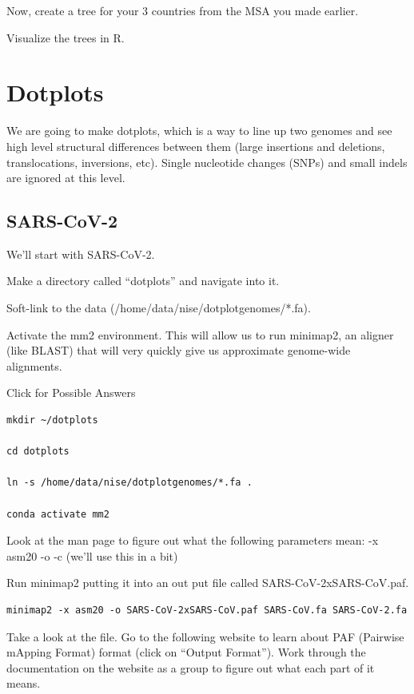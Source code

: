 \documentclass[
]{book}
\begin{document}
\hfill\break

Now, create a tree for your 3 countries from the MSA you made earlier.

Visualize the trees in R.

\hypertarget{dotplots}{%
\chapter{Dotplots}\label{dotplots}}

We are going to make dotplots, which is a way to line up two genomes and see high level structural differences between them (large insertions and deletions, translocations, inversions, etc). Single nucleotide changes (SNPs) and small indels are ignored at this level.

\hypertarget{sars-cov-2}{%
\section{SARS-CoV-2}\label{sars-cov-2}}

We'll start with SARS-CoV-2.

Make a directory called ``dotplots'' and navigate into it.

Soft-link to the data (/home/data/nise/dotplotgenomes/*.fa).

Activate the mm2 environment. This will allow us to run minimap2, an aligner (like BLAST) that will very quickly give us approximate genome-wide alignments.

Click for Possible Answers

\begin{verbatim}
mkdir ~/dotplots

cd dotplots

ln -s /home/data/nise/dotplotgenomes/*.fa .

conda activate mm2
\end{verbatim}

\hfill\break

Look at the man page to figure out what the following parameters mean:
-x asm20
-o
-c (we'll use this in a bit)

Run minimap2 putting it into an out put file called SARS-CoV-2xSARS-CoV.paf.

\begin{verbatim}
minimap2 -x asm20 -o SARS-CoV-2xSARS-CoV.paf SARS-CoV.fa SARS-CoV-2.fa
\end{verbatim}

Take a look at the file. Go to the following website to learn about PAF (Pairwise mApping Format) format (click on ``Output Format''). Work through the documentation on the website as a group to figure out what each part of it means.
\end{document}
